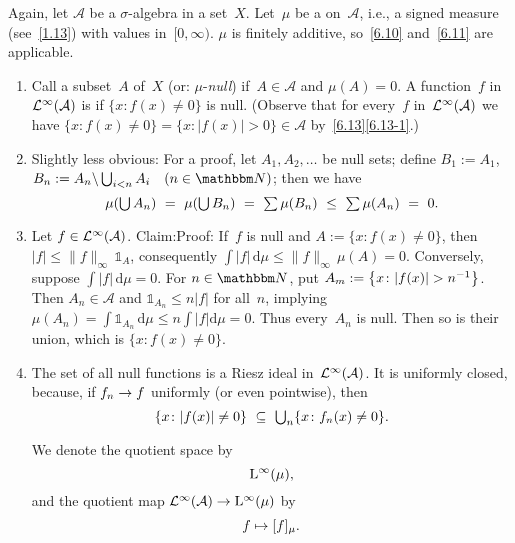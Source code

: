 \documentclass[main.tex]{subfiles}
\begin{document}
\begin{psec}{6.16}%
Again,
let $\mathcal A$ be a $\sigma$-algebra in a set~$X$.
Let~$\mu$ be a  on~$\mathcal A$,
i.e., a signed measure (see~\ref{1.13})
with values in~$[0,\infty)$.
$\mu$ is finitely additive,
so~\ref{6.10} and~\ref{6.11} are applicable.
\begin{enumerate}
\item\label{6.16-1}
Call a subset~$A$ of~$X$  (or: $\mu$-\emph{null})
if~$A\in\mathcal A$ and $\mu(A)=0$.
A function~$f$ in~$\mathcal{L}^\infty(\mathcal A)$ is 
if $\{x\colon f(x)\neq 0\}$ is null.
(Observe that for every~$f$ in~$\mathcal{L}^\infty(\mathcal{A})$
we have
$\{x\colon f(x)\neq 0\}
=\{x\colon |f(x)|>0\}\in\mathcal A$
by~\ref{6.13}\ref{6.13-1}.)
%
\item\label{6.16-2}
Slightly less obvious:
For a proof,
let $A_1,A_2,\dotsc$ be null sets;
define $B_1:=A_1$, 
$B_n:=A_n\backslash \bigcup_{i<n} A_i \quad (n\in\N)$; then we have
\begin{equation*}
\textstyle \mu(\bigcup A_n)\ 
=\ \mu(\bigcup B_n)\ 
=\ \sum \mu(B_n)\ 
\leq\ \sum \mu(A_n)\ =\ 0\htam{.}
\end{equation*}
%
\item\label{6.16-3}
Let $f\in\mathcal{L}^\infty(\mathcal A)$.
Claim:\statement{
\begin{equation*}
\textstyle f\htam{ is null} \quad\iff\quad \int|f|\,\mathrm{d}\mu=0\htam{.}
\end{equation*}
}Proof:
If~$f$ is null and $A:=\{x\colon f(x)\neq 0\}$,
then $|f|\leq\|f\|_\infty\,\mathbb{1}_A$,
consequently $\int|f|\,\mathrm{d}\mu \leq\|f\|_\infty \,\mu(A)=0$.
Conversely,
suppose $\int|f|\,\mathrm{d}\mu=0$.
For $n\in\N$, put
 $A_m:=\smash{\bigl\{x\colon |f(x)|>n^{-1}\bigr\}}$.
Then $A_n\in\mathcal A$ and $\mathbb{1}_{A_n}\leq n|f|$ for all~$n$,
implying
$\mu(A_n) 
= \int \mathbb{1}_{A_n}\,\mathrm{d}\mu
\leq n\int|f|\mathrm{d}\mu =0$.
Thus every~$A_n$ is null.
Then so is their union,
which is $\{x\colon f(x)\neq 0\}$.
%
\item\label{6.16-4}
The set of all null functions
is a Riesz ideal in~$\mathcal{L}^\infty(\mathcal A)$.
It is uniformly closed,
because,
if $f_n\rightarrow f$ uniformly (or even pointwise),
then 
\begin{equation*}
\textstyle \{x\colon |f(x)|\neq 0\} 
\ \subseteq\  \bigcup_n \{ x\colon f_n(x)\neq 0\}\text{.}
\end{equation*}

We denote the quotient space by
\begin{equation*}
\mathrm{L}^\infty(\mu)\text{,}
\end{equation*}
and the quotient map $\mathcal{L}^\infty(\mathcal A)\rightarrow\mathrm{L}^\infty(\mu)$ by
\begin{equation*}
f\mapsto [f]_\mu\text{.}
\end{equation*}
\end{enumerate}
\end{psec}
\end{document}
